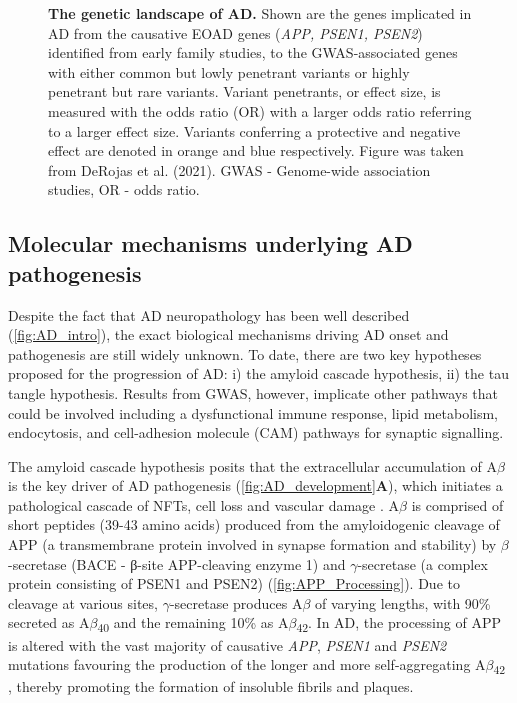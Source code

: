 \begin{landscape}
\begin{figure}[!htp]
		\caption[The genetic landscape of AD]%
		{\textbf{The genetic landscape of AD.} Shown are the genes implicated in AD from the causative EOAD genes (\textit{APP, PSEN1, PSEN2}) identified from early family studies, to the GWAS-associated genes with either common but lowly penetrant variants or highly penetrant but rare variants. Variant penetrants, or effect size, is measured with the odds ratio (OR) with a larger odds ratio referring to a larger effect size. Variants conferring a protective and negative effect are denoted in orange and blue respectively. Figure was taken from DeRojas et al. (2021)\cite{DeRojas2021}. GWAS - Genome-wide association studies, OR - odds ratio.
		}
		\label{fig:AD_gwas}
	\end{figure}
\end{landscape}

\subsection{Molecular mechanisms underlying AD pathogenesis}
\label{aetiologyAD}
Despite the fact that AD neuropathology has been well described (\cref{fig:AD_intro}), the exact biological mechanisms driving AD onset and pathogenesis are still widely unknown. To date, there are two key hypotheses proposed for the progression of AD: i) the amyloid cascade hypothesis, ii) the tau tangle hypothesis. Results from GWAS, however, implicate other pathways that could be involved including a dysfunctional immune response, lipid metabolism, endocytosis, and cell-adhesion molecule (CAM) pathways for synaptic signalling.  

The amyloid cascade hypothesis posits that the extracellular accumulation of A$\beta$ is the key driver of AD pathogenesis (\cref{fig:AD_development}\textbf{A}), which initiates a pathological cascade of NFTs, cell loss and vascular damage \cite{Hardy1992}. A$\beta$ is comprised of short peptides (39-43 amino acids) \cite{J1987} produced from the amyloidogenic cleavage of APP (a transmembrane protein involved in synapse formation and stability) by $\beta$-secretase (BACE - β-site APP-cleaving enzyme 1) and $\gamma$-secretase (a complex protein consisting of PSEN1 and PSEN2) (\cref{fig:APP_Processing}). Due to cleavage at various sites, $\gamma$-secretase produces A$\beta$ of varying lengths, with 90\% secreted as A$\beta$\textsubscript{40} and the remaining 10\% as A$\beta$\textsubscript{42}\cite{Asami-Odaka1995}. In AD, the processing of APP is altered with the vast majority of causative \textit{APP}, \textit{PSEN1} and \textit{PSEN2} mutations favouring the production of the longer and more self-aggregating A$\beta$\textsubscript{42} \cite{Li2019,D1996,JT1993}, thereby promoting the formation of insoluble fibrils and plaques\cite{JT1993}. 

